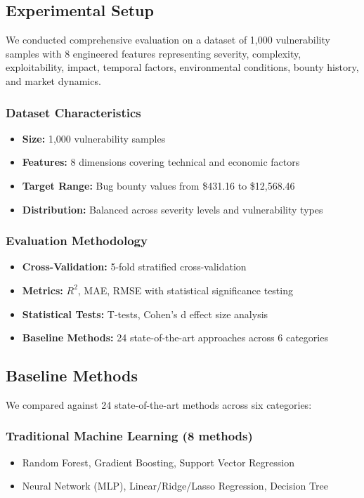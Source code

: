\documentclass[journal]{IEEEtran}
\begin{document}
\subsection{Experimental Setup}

We conducted comprehensive evaluation on a dataset of 1,000 vulnerability samples with 8 engineered features representing severity, complexity, exploitability, impact, temporal factors, environmental conditions, bounty history, and market dynamics.

\subsubsection{Dataset Characteristics}
\begin{itemize}
\item \textbf{Size:} 1,000 vulnerability samples
\item \textbf{Features:} 8 dimensions covering technical and economic factors
\item \textbf{Target Range:} Bug bounty values from \$431.16 to \$12,568.46
\item \textbf{Distribution:} Balanced across severity levels and vulnerability types
\end{itemize}

\subsubsection{Evaluation Methodology}
\begin{itemize}
\item \textbf{Cross-Validation:} 5-fold stratified cross-validation
\item \textbf{Metrics:} $R^2$, MAE, RMSE with statistical significance testing
\item \textbf{Statistical Tests:} T-tests, Cohen's d effect size analysis
\item \textbf{Baseline Methods:} 24 state-of-the-art approaches across 6 categories
\end{itemize}

\subsection{Baseline Methods}

We compared against 24 state-of-the-art methods across six categories:

\subsubsection{Traditional Machine Learning (8 methods)}
\begin{itemize}
\item Random Forest, Gradient Boosting, Support Vector Regression
\item Neural Network (MLP), Linear/Ridge/Lasso Regression, Decision Tree
\end{itemize}
\end{document}
